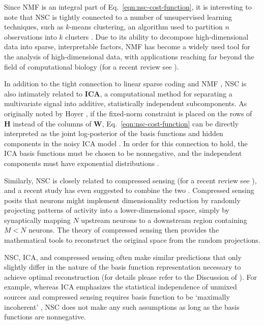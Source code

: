 Since \ac{NMF} is an integral part 
of Eq.~\ref{eqn:nsc-cost-function},
it is interesting to note that \ac{NSC} is tightly connected
to a number of unsupervised learning techniques,
such as $k$-means clustering,
an algorithm used to partition
$n$ observations into $k$ clusters
\cite{Ding2005}.
Due to its ability to decompose high-dimensional data into
sparse, interpretable factors, \ac{NMF} has become a 
widely used tool for the analysis of high-dimensional data,
with applications reaching far beyond
the field of computational biology
(for a recent review see \cite{Gillis2014}).

In addition to the tight connection 
to linear sparse coding and \ac{NMF}
\cite{EggertKorner2004},
\ac{NSC} is also intimately related to \textbf{\ac{ICA}},
a computational method for separating a multivariate signal
into additive, statistically independent subcomponents. 
As originally noted by Hoyer \cite{Hoyer2002},
if the fixed-norm constraint is placed on the rows of
\textbf{H} instead of the columns of \textbf{W},
Eq.~\ref{eqn:nsc-cost-function} can be directly interpreted as the joint
log-posterior of the basis functions and hidden components
in the noisy \ac{ICA} model \cite{HoyerHyvarinen2002}.
In order for this connection to hold,
the \ac{ICA} basis functions must be chosen to be nonnegative,
and the independent components must have 
exponential distributions \cite{Hoyer2002}.

Similarly, \ac{NSC} is closely related to compressed sensing
(for a recent review see \cite{GanguliSompolinsky2012}),
and a recent study has even suggested to combine the two
\cite{WangLi2010}.
Compressed sensing posits that neurons might implement 
dimensionality reduction by randomly projecting patterns of activity
into a lower-dimensional space,
simply by synaptically mapping $N$ upstream neurons to a downstream region
containing $M < N$ neurons. 
The theory of compressed sensing then provides the mathematical tools
to reconstruct the original space from the random projections.

\ac{NSC}, \ac{ICA}, and compressed sensing often make similar predictions
that only slightly differ in the nature of the basis function representation
necessary to achieve optimal reconstruction
(for details please refer to the Discussion of \cite{GanguliSompolinsky2012}).
For example, whereas \ac{ICA} emphasizes the statistical independence 
of unmixed sources
and compressed sensing requires basis function to be `maximally incoherent'
\cite{GanguliSompolinsky2012},
\ac{NSC} does not make any such assumptions
as long as the basis functions are nonnegative.



